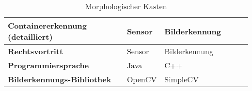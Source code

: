 \documentclass[a4paper, 10pt, fleqn]{article}
\begin{document}
\begin{table}[h]
\begin{tabular}{|m{}|M{0.15\textwidth}|M{0.15\textwidth}|M{0.15\textwidth}|M{0.15\textwidth}M{0.001\textwidth}|}
\textbf{Containererkennung (detailliert)} & Sensor & Bilderkennung&&&\\[5ex]\hline

\textbf{Rechtsvortritt} & Sensor & Bilderkennung&&&\\[5ex]\hline

\textbf{Programmiersprache} & Java & C++&&&\\[5ex]\hline

\textbf{Bilderkennungs-Bibliothek} & OpenCV & SimpleCV&&&\\[5ex]\hline


\end{tabular}\\
\caption{Morphologischer Kasten}
\end{table}

\clearpage





































\end{document}
